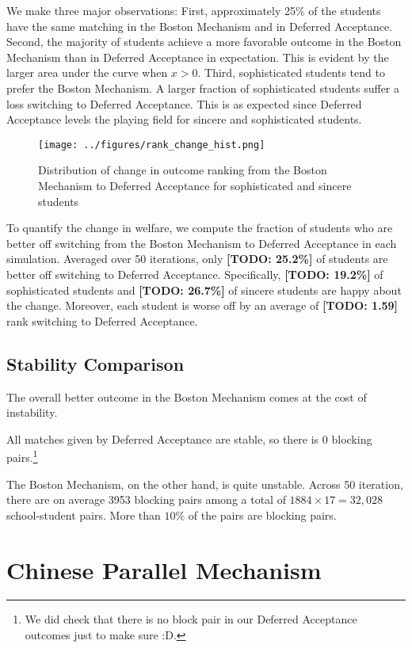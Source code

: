 \documentclass{article}
\newcommand{\TODO}[1]{
{\color{red}\textbf{[TODO: #1]}}}
\begin{document}
We make three major observations:
First, approximately 25\% of the students have the same matching in the Boston Mechanism and in Deferred Acceptance. 
Second, the majority of students achieve a more favorable outcome in the Boston Mechanism than in Deferred Acceptance in expectation. This is evident by the larger area under the curve  when $x > 0$. 
Third, sophisticated students tend to prefer the Boston Mechanism. A larger fraction of sophisticated students suffer a loss switching to Deferred Acceptance. 
This is as expected since Deferred Acceptance levels the playing field for sincere and sophisticated students. 

\begin{figure}[h]
  \centering
  \texttt{[image: ../figures/rank\_change\_hist.png]}
  \caption{Distribution of change in outcome ranking from the Boston Mechanism to Deferred Acceptance for sophisticated and sincere students}
  \label{fig:figure3}
\end{figure}

To quantify the change in welfare, we compute the fraction of students who are better off switching from the Boston Mechanism to Deferred Acceptance in each simulation. Averaged over 50 iterations, only \TODO{25.2\%} of students are better off switching to Deferred Acceptance. Specifically, \TODO{19.2\%} of sophisticated students and \TODO{26.7\%} of sincere students are happy about the change. Moreover, each student is worse off by an average of \TODO{1.59} rank switching to Deferred Acceptance.


\subsection{Stability Comparison}
The overall better outcome in the Boston Mechanism comes at the cost of instability. 

All matches given by Deferred Acceptance are stable, so there is 0 blocking pairs.\footnote{We did check that there is no block pair in our Deferred Acceptance outcomes just to make sure :D.}

The Boston Mechanism, on the other hand, is quite unstable. Across 50 iteration, there are on average 3953 blocking pairs among a total of $1884\times17=32,028$ school-student pairs. More than $10\%$ of the pairs are blocking pairs.

\section{Chinese Parallel Mechanism}
\end{document}
